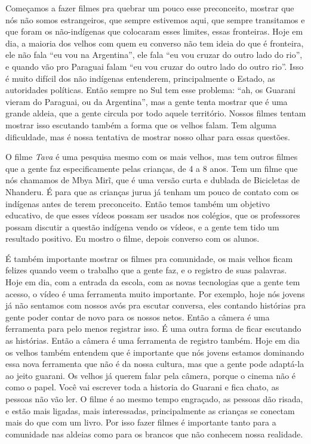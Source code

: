 {{Começamos a fazer filmes pra quebrar um pouco esse preconceito, mostrar
que nós não somos estrangeiros, que sempre estivemos aqui, que sempre
transitamos e que foram os não-indígenas que colocaram esses limites,
essas fronteiras. Hoje em dia, a maioria dos velhos com quem eu
converso não tem ideia do que é fronteira, ele não fala ``eu vou na
Argentina'', ele fala ``eu vou cruzar do outro lado do rio'', e quando vão
pro Paraguai falam ``eu vou cruzar do outro lado do outro rio''. Isso é
muito difícil dos não indígenas entenderem, principalmente o Estado, as
autoridades políticas. Então sempre no Sul tem esse problema: ``ah, os
Guarani vieram do Paraguai, ou da Argentina'', mas a gente tenta mostrar
que é uma grande aldeia, que a gente circula por todo aquele
território. Nossos filmes tentam mostrar isso escutando também a forma
que os velhos falam. Tem alguma dificuldade, mas é nossa tentativa de
mostrar nosso olhar para essas questões.

O filme \emph{Tava} é uma pesquisa mesmo com os mais velhos, mas tem outros
filmes que a gente faz especificamente pelas crianças, de 4 a 8 anos.
Tem um filme que nós chamamos de Mbya Mirĩ, que é uma
versão curta e dublada de Bicicletas de Nhanderu. É para que as
crianças jurua já tenham um pouco de contato com os indígenas antes de
terem preconceito. Então temos também um objetivo educativo, de que
esses vídeos possam ser usados nos colégios, que os professores possam
discutir a questão indígena vendo os vídeos, e a gente tem tido um
resultado positivo. Eu mostro o filme, depois converso com os alunos. 

É também importante mostrar os filmes pra comunidade, os mais velhos
ficam felizes quando veem o trabalho que a gente faz, e o registro de
suas palavras. Hoje em dia, com a entrada da escola, com as novas
tecnologias que a gente tem acesso, o vídeo é uma ferramenta muito
importante. Por exemplo, hoje nós jovens já não sentamos com nossos
avós pra escutar conversa, eles contando histórias pra gente poder
contar de novo para os nossos netos. Então a câmera é uma ferramenta
para pelo menos registrar isso. É uma outra forma de ficar escutando as
histórias. Então a câmera é uma ferramenta de registro também. Hoje em
dia os velhos também entendem que é importante que nós jovens estamos
dominando essa nova ferramenta que não é da nossa cultura, mas que a
gente pode adaptá-la ao jeito guarani. Os velhos já querem falar pela
câmera, porque o cinema não é como o papel. Você vai escrever toda a
historia do Guarani e fica chato, as pessoas não vão ler. O filme é ao
mesmo tempo engraçado, as pessoas dão risada, e estão mais ligadas,
mais interessadas, principalmente as crianças se conectam mais do que
com um livro. Por isso fazer filmes é importante tanto para a
comunidade nas aldeias como para os brancos que não conhecem nossa
realidade.

}}
